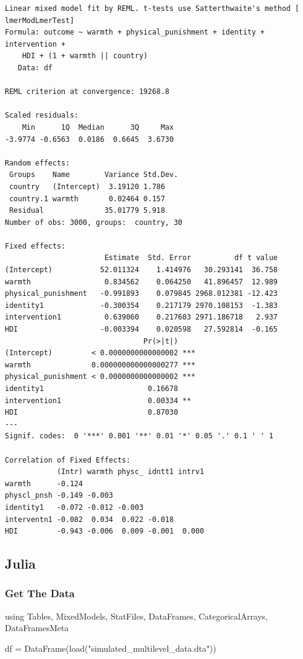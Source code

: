 \documentclass[
  letterpaper,
  DIV=11,
  numbers=noendperiod]{scrreprt}
\newenvironment{Shaded}{\begin{snugshade}}{\end{snugshade}}
\newcommand{\BuiltInTok}[1]{\textcolor[rgb]{0.00,0.23,0.31}{#1}}
\newcommand{\FunctionTok}[1]{\textcolor[rgb]{0.28,0.35,0.67}{#1}}
\newcommand{\ImportTok}[1]{\textcolor[rgb]{0.00,0.46,0.62}{#1}}
\newcommand{\NormalTok}[1]{\textcolor[rgb]{0.00,0.23,0.31}{#1}}
\newcommand{\OperatorTok}[1]{\textcolor[rgb]{0.37,0.37,0.37}{#1}}
\newcommand{\StringTok}[1]{\textcolor[rgb]{0.13,0.47,0.30}{#1}}
\begin{document}
\begin{verbatim}
Linear mixed model fit by REML. t-tests use Satterthwaite's method [
lmerModLmerTest]
Formula: outcome ~ warmth + physical_punishment + identity + intervention +  
    HDI + (1 + warmth || country)
   Data: df

REML criterion at convergence: 19268.8

Scaled residuals: 
    Min      1Q  Median      3Q     Max 
-3.9774 -0.6563  0.0186  0.6645  3.6730 

Random effects:
 Groups    Name        Variance Std.Dev.
 country   (Intercept)  3.19120 1.786   
 country.1 warmth       0.02464 0.157   
 Residual              35.01779 5.918   
Number of obs: 3000, groups:  country, 30

Fixed effects:
                       Estimate  Std. Error          df t value
(Intercept)           52.011324    1.414976   30.293141  36.758
warmth                 0.834562    0.064250   41.896457  12.989
physical_punishment   -0.991893    0.079845 2968.012381 -12.423
identity1             -0.300354    0.217179 2970.108153  -1.383
intervention1          0.639060    0.217603 2971.186718   2.937
HDI                   -0.003394    0.020598   27.592814  -0.165
                                Pr(>|t|)    
(Intercept)         < 0.0000000000000002 ***
warmth              0.000000000000000277 ***
physical_punishment < 0.0000000000000002 ***
identity1                        0.16678    
intervention1                    0.00334 ** 
HDI                              0.87030    
---
Signif. codes:  0 '***' 0.001 '**' 0.01 '*' 0.05 '.' 0.1 ' ' 1

Correlation of Fixed Effects:
            (Intr) warmth physc_ idntt1 intrv1
warmth      -0.124                            
physcl_pnsh -0.149 -0.003                     
identity1   -0.072 -0.012 -0.003              
interventn1 -0.082  0.034  0.022 -0.018       
HDI         -0.943 -0.006  0.009 -0.001  0.000
\end{verbatim}

\subsection{Julia}

\subsubsection{Get The Data}\label{get-the-data-2}

\begin{Shaded}
\begin{Highlighting}[]
\ImportTok{using} \BuiltInTok{Tables}\NormalTok{, }\BuiltInTok{MixedModels}\NormalTok{, }\BuiltInTok{StatFiles}\NormalTok{, }\BuiltInTok{DataFrames}\NormalTok{, }\BuiltInTok{CategoricalArrays}\NormalTok{, }\BuiltInTok{DataFramesMeta}

\NormalTok{df }\OperatorTok{=} \FunctionTok{DataFrame}\NormalTok{(}\FunctionTok{load}\NormalTok{(}\StringTok{"simulated\_multilevel\_data.dta"}\NormalTok{))}
\end{Highlighting}
\end{Shaded}
\end{document}
